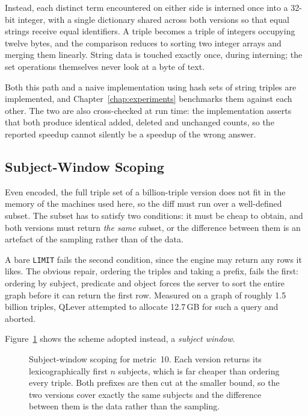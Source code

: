 Instead, each distinct term encountered on either side is interned once into a
32-bit integer, with a single dictionary shared across both versions so that
equal strings receive equal identifiers. A triple becomes a triple of integers
occupying twelve bytes, and the comparison reduces to sorting two integer arrays
and merging them linearly. String data is touched exactly once, during
interning; the set operations themselves never look at a byte of text.

Both this path and a naive implementation using hash sets of string triples are
implemented, and Chapter~\ref{chap:experiments} benchmarks them against each
other. The two are also cross-checked at run time: the implementation asserts
that both produce identical added, deleted and unchanged counts, so the reported
speedup cannot silently be a speedup of the wrong answer.

\subsection{Subject-Window Scoping}
\label{subsec:subject_window}

Even encoded, the full triple set of a billion-triple version does not fit in the
memory of the machines used here, so the diff must run over a well-defined
subset. The subset has to satisfy two conditions: it must be cheap to obtain, and
both versions must return \emph{the same} subset, or the difference between them
is an artefact of the sampling rather than of the data.

A bare \texttt{LIMIT} fails the second condition, since the engine may return any
rows it likes. The obvious repair, ordering the triples and taking a prefix,
fails the first: ordering by subject, predicate and object forces the server to
sort the entire graph before it can return the first row. Measured on a graph of
roughly 1.5 billion triples, QLever attempted to allocate 12.7\,GB for such a
query and aborted.

Figure~\ref{fig:window} shows the scheme adopted instead, a
\emph{subject window}.

\begin{figure}[htbp]
  \centering
  \figwindow
  \caption[]{Subject-window scoping for metric~10. Each
    version returns its lexicographically first $n$ subjects, which is far
    cheaper than ordering every triple. Both prefixes are then cut at the
    smaller bound, so the two versions cover exactly the same subjects and the
    difference between them is the data rather than the sampling.}
  \label{fig:window}
\end{figure}

